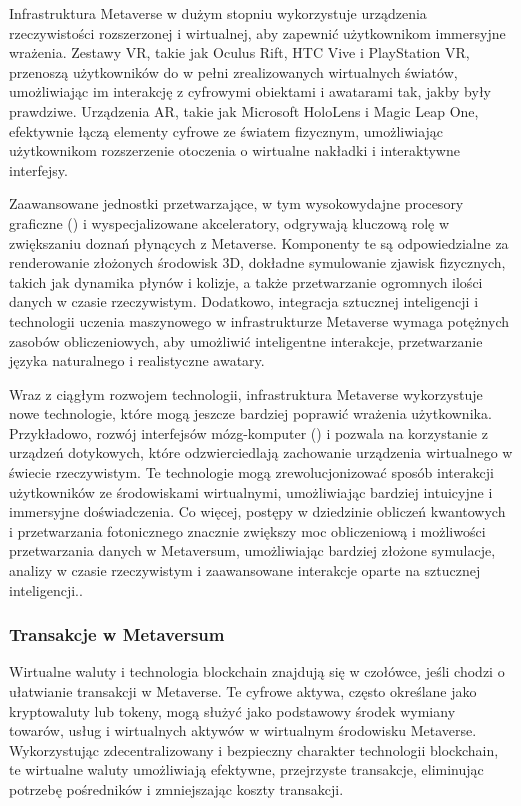 Infrastruktura Metaverse w dużym stopniu wykorzystuje urządzenia rzeczywistości rozszerzonej i wirtualnej, aby zapewnić użytkownikom immersyjne wrażenia. Zestawy VR, takie jak Oculus Rift, HTC Vive i PlayStation VR, przenoszą użytkowników do w pełni zrealizowanych wirtualnych światów, umożliwiając im interakcję z cyfrowymi obiektami i awatarami tak, jakby były prawdziwe. Urządzenia AR, takie jak Microsoft HoloLens i Magic Leap One, efektywnie łączą elementy cyfrowe ze światem fizycznym, umożliwiając użytkownikom rozszerzenie otoczenia o wirtualne nakładki i interaktywne interfejsy\cite{metaverseInfrastructureIEEE}.

Zaawansowane jednostki przetwarzające, w tym wysokowydajne procesory graficzne  () i wyspecjalizowane akceleratory, odgrywają kluczową rolę w zwiększaniu doznań płynących z Metaverse. Komponenty te są odpowiedzialne za renderowanie złożonych środowisk 3D, dokładne symulowanie zjawisk fizycznych, takich jak dynamika płynów i kolizje, a także przetwarzanie ogromnych ilości danych w czasie rzeczywistym. Dodatkowo, integracja sztucznej inteligencji i technologii uczenia maszynowego w infrastrukturze Metaverse wymaga potężnych zasobów obliczeniowych, aby umożliwić inteligentne interakcje, przetwarzanie języka naturalnego i realistyczne awatary\cite{metaverseInfrastructureIEEE}.

Wraz z ciągłym rozwojem technologii, infrastruktura Metaverse wykorzystuje nowe technologie, które mogą jeszcze bardziej poprawić wrażenia użytkownika. Przykładowo, rozwój interfejsów mózg-komputer  () i pozwala na korzystanie z urządzeń dotykowych, które odzwierciedlają zachowanie urządzenia wirtualnego w świecie rzeczywistym. Te technologie mogą zrewolucjonizować sposób interakcji użytkowników ze środowiskami wirtualnymi, umożliwiając bardziej intuicyjne i immersyjne doświadczenia. Co więcej, postępy w dziedzinie obliczeń kwantowych i przetwarzania fotonicznego znacznie zwiększy moc obliczeniową i możliwości przetwarzania danych w Metaversum, umożliwiając bardziej złożone symulacje, analizy w czasie rzeczywistym i zaawansowane interakcje oparte na sztucznej inteligencji.\cite{metaverseInfrastructureIEEE}.

\subsubsection{Transakcje w Metaversum}

Wirtualne waluty i technologia blockchain znajdują się w czołówce, jeśli chodzi o ułatwianie transakcji w Metaverse. Te cyfrowe aktywa, często określane jako kryptowaluty lub tokeny, mogą służyć jako podstawowy środek wymiany towarów, usług i wirtualnych aktywów w wirtualnym środowisku Metaverse. Wykorzystując zdecentralizowany i bezpieczny charakter technologii blockchain, te wirtualne waluty umożliwiają efektywne, przejrzyste transakcje, eliminując potrzebę pośredników i zmniejszając koszty transakcji\cite{metaverseInfrastructureIEEE}.

